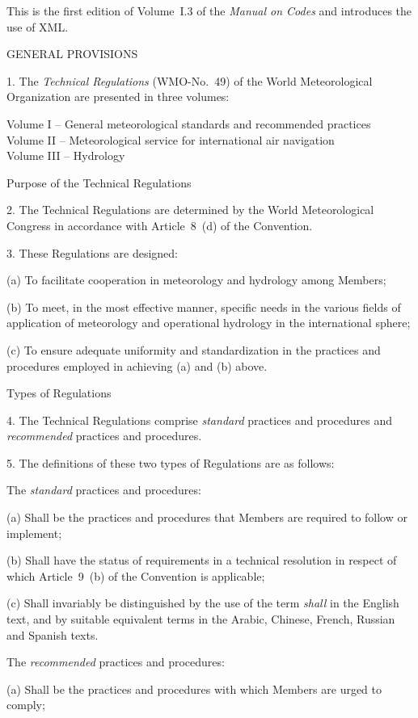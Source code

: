 This is the first edition of Volume~I.3 of the \emph{Manual on Codes} and introduces the use of XML.

GENERAL PROVISIONS

1. The \emph{Technical Regulations} (WMO-No.~49) of the World Meteorological Organization are presented in three volumes:

Volume I -- General meteorological standards and recommended practices\\
Volume II -- Meteorological service for international air navigation\\
Volume III -- Hydrology

Purpose of the Technical Regulations

2. The Technical Regulations are determined by the World Meteorological Congress in accordance with Article~8~(d) of the Convention.

3. These Regulations are designed:

(a) To facilitate cooperation in meteorology and hydrology among Members;

(b) To meet, in the most effective manner, specific needs in the various fields of application of meteorology and operational hydrology in the international sphere;

(c) To ensure adequate uniformity and standardization in the practices and procedures employed in achieving (a) and (b) above.

Types of Regulations

4. The Technical Regulations comprise \emph{standard} practices and procedures and \emph{recommended} practices and procedures.

5. The definitions of these two types of Regulations are as follows:

The \emph{standard} practices and procedures:

(a) Shall be the practices and procedures that Members are required to follow or implement;

(b) Shall have the status of requirements in a technical resolution in respect of which Article~9~(b) of the Convention is applicable;

(c) Shall invariably be distinguished by the use of the term \emph{shall} in the English text, and by suitable equivalent terms in the Arabic, Chinese, French, Russian and Spanish texts.

The \emph{recommended} practices and procedures:

(a) Shall be the practices and procedures with which Members are urged to comply;

